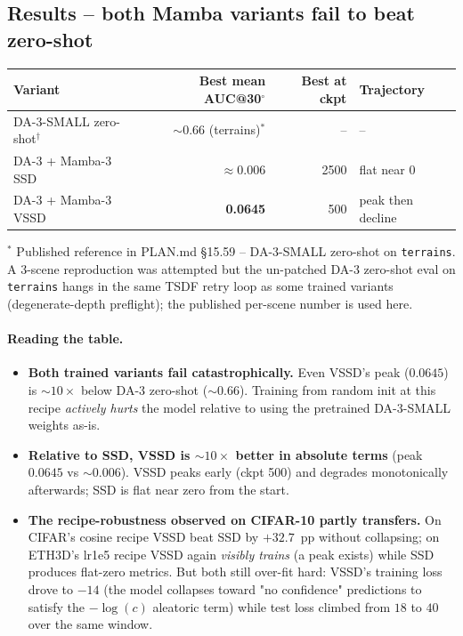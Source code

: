\documentclass[11pt,a4paper]{article}
\begin{document}
\subsection{Results -- both Mamba variants fail to beat zero-shot}

\begin{center}\small
\begin{tabular}{lrrl}
\toprule
Variant & Best mean AUC@30$^\circ$ & Best at ckpt & Trajectory \\
\midrule
DA-3-SMALL zero-shot$^{\dagger}$ & $\sim 0.66$ (terrains)$^*$ & -- & -- \\
DA-3 + Mamba-3 SSD & $\approx 0.006$ & 2500 & flat near 0 \\
DA-3 + Mamba-3 VSSD & \textbf{0.0645} & 500 & peak then decline \\
\bottomrule
\end{tabular}
\end{center}


\noindent$^*$ Published reference in PLAN.md \S15.59 -- DA-3-SMALL
zero-shot on \texttt{terrains}. A 3-scene reproduction was attempted
but the un-patched DA-3 zero-shot eval on \texttt{terrains} hangs in
the same TSDF retry loop as some trained variants (degenerate-depth
preflight); the published per-scene number is used here.

\paragraph{Reading the table.}
\begin{itemize}
  \item \textbf{Both trained variants fail catastrophically.} Even
        VSSD's peak ($0.0645$) is $\sim 10\times$ below DA-3 zero-shot
        ($\sim 0.66$). Training from random init at this recipe
        \emph{actively hurts} the model relative to using the
        pretrained DA-3-SMALL weights as-is.
  \item \textbf{Relative to SSD, VSSD is $\sim 10\times$ better in
        absolute terms} (peak $0.0645$ vs $\sim 0.006$). VSSD peaks
        early (ckpt 500) and degrades monotonically afterwards;
        SSD is flat near zero from the start.
  \item \textbf{The recipe-robustness observed on CIFAR-10 partly
        transfers.} On CIFAR's cosine recipe VSSD beat SSD by
        $+32.7$~pp without collapsing; on ETH3D's lr1e5 recipe VSSD
        again \emph{visibly trains} (a peak exists) while SSD
        produces flat-zero metrics. But both still over-fit hard:
        VSSD's training loss drove to $-14$ (the model collapses
        toward "no confidence" predictions to satisfy the
        $-\log(c)$ aleatoric term) while test loss climbed from
        $18$ to $40$ over the same window.
\end{itemize}
\end{document}
